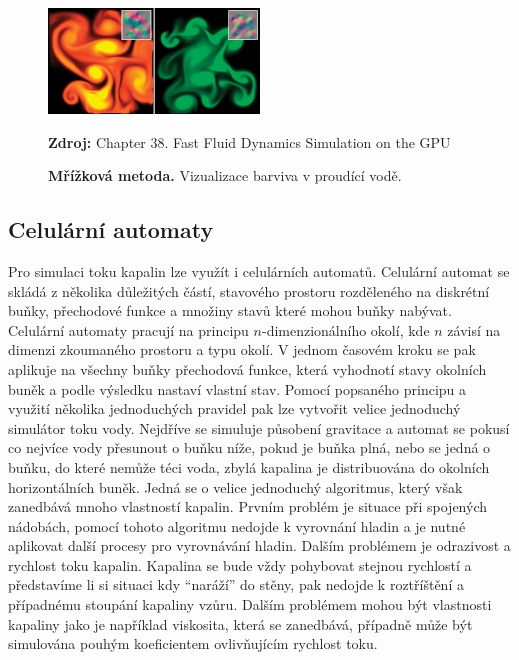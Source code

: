 \begin{figure}[hbt]
	\centering
	\captionsetup{justification=centering}
	\includegraphics[width=0.5\textwidth]{obrazky-figures/GridFluid.jpg}
	\caption{\textbf{Mřížková metoda.} Vizualizace barviva v proudící vodě.}
	\textbf{Zdroj: } Chapter 38. Fast Fluid Dynamics Simulation on the GPU \cite{GPUGemsGridFLuid}
	\label{fig:EulerFluid}
\end{figure}
 
\subsection{Celulární automaty}
Pro simulaci toku kapalin lze využít i celulárních automatů. Celulární automat se skládá z několika důležitých částí, stavového prostoru rozděleného na diskrétní buňky, přechodové funkce a množiny stavů které mohou buňky nabývat. Celulární automaty pracují na principu $n$-dimenzionálního okolí, kde $n$ závisí na dimenzi zkoumaného prostoru a typu okolí. V jednom časovém kroku se pak aplikuje na všechny buňky přechodová funkce, která vyhodnotí stavy okolních buněk a podle výsledku nastaví vlastní stav. 
Pomocí popsaného principu a využití několika jednoduchých pravidel pak lze vytvořit velice jednoduchý simulátor toku vody. Nejdříve se simuluje působení gravitace a automat se pokusí co nejvíce vody přesunout o buňku níže, pokud je buňka plná, nebo se jedná o buňku, do které nemůže téci voda, zbylá kapalina je distribuována do okolních horizontálních buněk. Jedná se o velice jednoduchý algoritmus, který však zanedbává mnoho vlastností kapalin. Prvním problém je situace při spojených nádobách, pomocí tohoto algoritmu nedojde k vyrovnání hladin a je nutné aplikovat další procesy pro vyrovnávání hladin. Dalším problémem je odrazivost a rychlost toku kapalin. Kapalina se bude vždy pohybovat stejnou rychlostí a představíme li si situaci kdy \enquote{naráží} do stěny, pak nedojde k roztříštění a případnému stoupání kapaliny vzůru. Dalším problémem mohou být vlastnosti kapaliny jako je například viskosita, která se zanedbává, případně může být simulována pouhým koeficientem ovlivňujícím rychlost toku.

